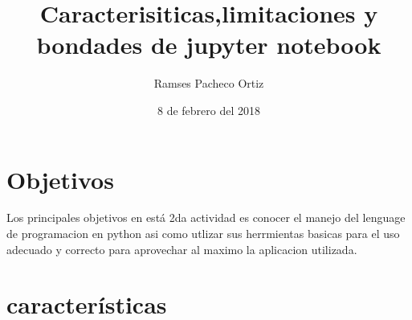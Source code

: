 \documentclass{article}
\title{Caracterisiticas,limitaciones y bondades de jupyter notebook}
\author{Ramses Pacheco Ortiz}
\date{8 de febrero del 2018}
\begin{document}
\maketitle

\section{Objetivos}
Los principales objetivos en está 2da actividad es conocer el manejo del lenguage de programacion en python asi como utlizar sus herrmientas basicas para el uso adecuado y correcto para aprovechar al maximo la aplicacion utilizada.


\section{características}
\end{document}

